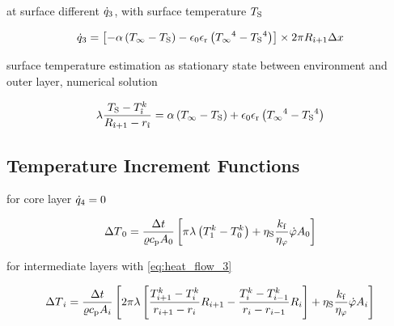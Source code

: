 \documentclass{scrartcl}
\begin{document}
    at surface different ${\dot{q}}_3$, with surface temperature ${T_\mathrm{S}}$

    \begin{equation}
        {\dot{q}}_3 = \left[ -{\alpha} \left( {T_\infty} - {T_\mathrm{S}} \right) - {\epsilon_0}{\epsilon_\mathrm{r}}\left( {T_\infty}^4 - {T_\mathrm{S}}^4 \right) \right]
        \times 2 \pi {R}_{{\hat{\imath}}+1} {\Delta x}
        \label{eq:heat_flow_3_surface}
    \end{equation}

    surface temperature estimation as stationary state between environment and outer layer, numerical solution

    \begin{equation}
        {\lambda} \frac{{T_\mathrm{S}} - {T}_{\hat{\imath}}^{k}}{{R}_{{\hat{\imath}}+1} - {r}_{{\hat{\imath}}}} = {\alpha} \left( {T_\infty} - {T_\mathrm{S}} \right) + {\epsilon_0}{\epsilon_\mathrm{r}}\left( {T_\infty}^4 - {T_\mathrm{S}}^4 \right)
        \label{eq:surface_temperature}
    \end{equation}

    \subsection{Temperature Increment Functions}

    for core layer ${\dot{q}}_4 = 0$

    \begin{equation}
        {\Delta T}_0 = \frac{{\Delta t}}{{\varrho}{c_\mathrm{p}}{A}_0} \left[ \pi {\lambda} \left( {T}_1^{k} - {T}_0^{k} \right) + {\eta_\mathrm{S}} \frac{{k_\mathrm{f}}}{{\eta_\varphi}} {\dot{\varphi}} {A}_0 \right]
        \label{eq:increment_core}
    \end{equation}

    for intermediate layers with \autoref{eq:heat_flow_3}

    \begin{equation}
        {\Delta T}_{i} = \frac{{\Delta t}}{{\varrho}{c_\mathrm{p}}{A}_{i}}
        \left[
        2 \pi {\lambda} \left[
            \frac{{T}_{{i}+1}^{k} - {T}_{i}^{k}}{{r}_{{i}+1}-{r}_{{i}}}
            {R}_{{i}+1}
            -\frac{{T}_{{i}}^{k} - {T}_{{i}-1}^{k}}{{r}_{{i}}-{r}_{{i}-1}}
            {R}_{{i}}
            \right]
        + {\eta_\mathrm{S}} \frac{{k_\mathrm{f}}}{{\eta_\varphi}} {\dot{\varphi}} {A}_{{i}}
        \right]
        \label{eq:increment_layer}
    \end{equation}
\end{document}
